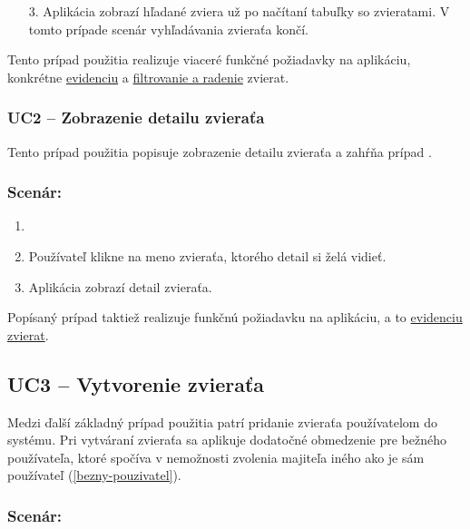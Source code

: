 \begin{enumerate}
    \item [3.] Aplikácia zobrazí hľadané zviera už po načítaní tabuľky so zvieratami. V tomto prípade scenár vyhľadávania zvieraťa končí.
\end{enumerate}

Tento prípad použitia realizuje viaceré funkčné požiadavky na aplikáciu, konkrétne \hyperref[evidencia-zvierat]{evidenciu} a \hyperref[filtrovanie-a-radenie]{filtrovanie a radenie} zvierat.

\subsubsection*{UC2 -- Zobrazenie detailu zvieraťa}\label{uc2}

Tento prípad použitia popisuje zobrazenie detailu zvieraťa a zahŕňa prípad .

\subsubsection*{Scenár:}

\begin{enumerate}
	\item {}
	\item Používateľ klikne na meno zvieraťa, ktorého detail si želá vidieť.
	\item Aplikácia zobrazí detail zvieraťa.
\end{enumerate}

Popísaný prípad taktiež realizuje funkčnú požiadavku na aplikáciu, a to \hyperref[evidencia-zvierat]{evidenciu zvierat}.

\subsection*{UC3 -- Vytvorenie zvieraťa}

Medzi ďalší základný prípad použitia patrí pridanie zvieraťa používatelom do systému.
Pri vytváraní zvieraťa sa aplikuje dodatočné obmedzenie pre bežného používateľa, ktoré spočíva v nemožnosti zvolenia majiteľa iného ako je sám používateľ (\ref{bezny-pouzivatel}).

\subsubsection*{Scenár:}

